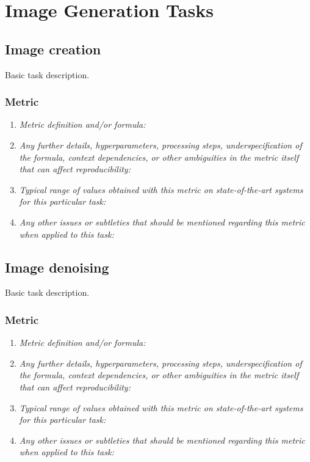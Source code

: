 \documentclass[a4paper,11pt]{article}
\begin{document}
\section{Image Generation Tasks}
\subsection{Image creation} \label{image_creation}
    Basic task description.
    \subsubsection{Metric}
        \begin{enumerate}[label=\alph*.]
            \item \textit{Metric definition and/or formula:}
            \bigskip
            \item \textit{Any further details, hyperparameters, processing steps, underspecification of the formula, context dependencies, or other ambiguities in the metric itself that can affect reproducibility:}
            \bigskip
            \item \textit{Typical range of values obtained with this metric on state-of-the-art systems for this particular task:}
            \bigskip
            \item \textit{Any other issues or subtleties that should be mentioned regarding this metric when applied to this task:}
            \bigskip
        \end{enumerate}

\subsection{Image denoising} \label{image_denoising}
    Basic task description.
    \subsubsection{Metric}
        \begin{enumerate}[label=\alph*.]
            \item \textit{Metric definition and/or formula:}
            \bigskip
            \item \textit{Any further details, hyperparameters, processing steps, underspecification of the formula, context dependencies, or other ambiguities in the metric itself that can affect reproducibility:}
            \bigskip
            \item \textit{Typical range of values obtained with this metric on state-of-the-art systems for this particular task:}
            \bigskip
            \item \textit{Any other issues or subtleties that should be mentioned regarding this metric when applied to this task:}
            \bigskip
        \end{enumerate}
\end{document}
